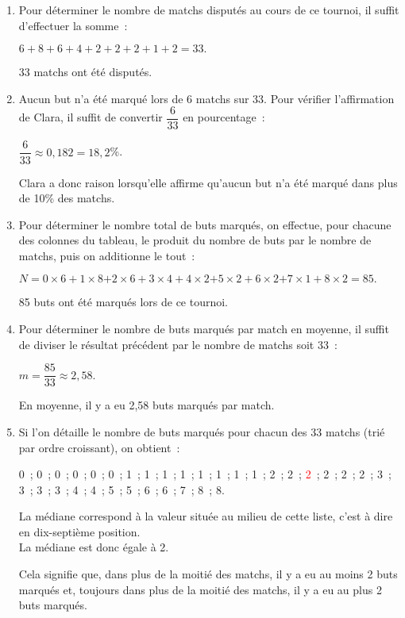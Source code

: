 \begin{corrige}
     \begin{enumerate}
          \item %
          Pour déterminer le nombre de matchs disputés au cours de ce tournoi, il suffit d'effectuer la somme~:
          \par
          $6 + 8 + 6 + 4 + 2 + 2 + 2 + 1 + 2 $\nosp$=33.$
          \par
          33 matchs ont été disputés.
          \item %
          Aucun but n'a été marqué lors de 6 matchs sur 33. Pour vérifier l'affirmation de Clara, il suffit de convertir $\dfrac{6}{33}$ en pourcentage~:
          \par
          $\dfrac{6}{33} \approx 0,182=18,2$\%.
          \par
          Clara a donc raison lorsqu'elle affirme qu'aucun but n'a été marqué dans plus de 10\% des matchs.
          \item %
          Pour déterminer le nombre total de buts marqués, on effectue, pour chacune des colonnes du tableau, le produit du nombre de buts par le nombre de matchs, puis on additionne le tout~:
          \begin{center}
               $N=  0 \times 6 + 1 \times 8 $\nosp$ + 2 \times 6 + 3 \times 4 +  4 \times 2  $\nosp$ +  5 \times 2  +  6 \times 2  $\nosp$+  7 \times 1  + 8 \times 2$\nosp$ = 85.$
          \end{center}
          85 buts ont été marqués lors de ce tournoi.
          \item %
          Pour déterminer le nombre de buts marqués par match en moyenne, il suffit de diviser le résultat précédent par le nombre de matchs soit 33~:
          \par
          $m=\dfrac{85}{33} \approx 2,58.$
          \par
          En moyenne, il y a eu 2,58 buts marqués par match.
          \par
          \item %
          Si l'on détaille le nombre de buts marqués pour chacun des 33 matchs (trié par ordre croissant), on obtient~:
          \begin{center}
               0~; 0~; 0~; 0~; 0~; 0~; 1~; 1~; 1~; 1~; 1~; 1~; 1~; 1~; 2~; 2~; \textcolor{red}{2}~; 2~; 2~; 2~; 3~; 3~; 3~; 3~; 4~; 4~; 5~; 5~; 6~; 6~; 7~;  8~; 8.
          \end{center}
          La médiane correspond à la valeur située \og au milieu \fg{} de cette liste, c'est à dire en dix-septième position. \\
          La médiane est donc égale à 2.
          \par
          Cela signifie que, dans plus de la moitié des matchs, il y a eu au moins 2 buts marqués et, toujours dans plus de la moitié des matchs, il y a eu au plus 2 buts marqués.
     \end{enumerate}
\end{corrige}
